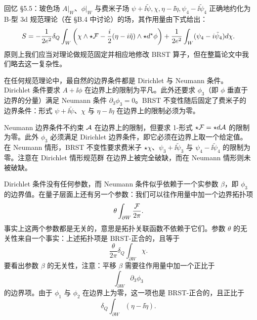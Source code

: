 回忆 §5.5：玻色场 $A|_W$、$\phi|_W$ 与费米子场 $\psi+\ii\tilde\psi,\chi,\eta-\ii\tilde\eta,\psi_4-\ii\tilde\psi_4$ 正确地约化为 B-型 3d 规范理论（在 §B.4 中讨论）的场，其作用量由下式给出：
\[
S=-\frac{1}{2e^2}\delta_Q\int_W\left(\chi\wedge\star\mathcal{F}-\frac{i}{2}(\eta-i\tilde\eta)\wedge\star d^{\star}\phi\right)
+\frac{1}{2e^2}\int_W(\psi_4-i\tilde\psi_4)d\chi .
\]
原则上我们应当对理论做规范固定并相应地修改 BRST 算子，但在整篇论文中我们略去这一复杂性。


在任何规范理论中，最自然的边界条件都是 Dirichlet 与 Neumann 条件。Dirichlet 条件要求 $A+\ii\phi$ 在边界上的限制为平凡。此外还要求 $\phi_3$（即 $\phi$ 垂直于边界的分量）满足 Neumann 条件 $\partial_3\phi_3=0$。BRST 不变性随后固定了费米子的边界条件：形式 $\psi+\ii\tilde\psi$、$\chi$ 与 $\eta-\ii\tilde\eta$ 在边界上的限制必须为零。


Neumann 边界条件不约束 $\mathcal{A}$ 在边界上的限制，但要求 1-形式 $\star\mathcal{F}=\star d\mathcal{A}$ 的限制为零。此外 $\phi_3$ 必须满足 Dirichlet 边界条件，即它必须在边界上取一个给定值。在 Neumann 情形，BRST 不变性要求费米子 $\star\chi$、$\psi_3+\ii\tilde\psi_3$ 与 $\psi_4-\ii\tilde\psi_4$ 的限制为零。注意在 Dirichlet 情形规范群
在边界上被完全破缺，而在 Neumann 情形则未被破缺。

Dirichlet 条件没有任何参数，而 Neumann 条件似乎依赖于一个实参数 $\beta$，即 $\phi_3$ 的边界值。在量子层面上还有另一个参数：我们可以往作用量中加一个边界拓扑项
\[
\theta\int_{\partial W}\frac{\mathcal{F}}{2\pi}.
\]
事实上这两个参数都是无关的，意思是拓扑关联函数不依赖于它们。参数 $\theta$ 的无关性来自一个事实：上述拓扑项是 BRST-正合的，且等于
\[
\frac{\theta}{2\pi}\delta_Q\int_{\partial W}\chi .
\]
要看出参数 $\beta$ 的无关性，注意：平移 $\beta$ 需要往作用量中加一个正比于
\[
\int_{\partial W}\partial_3\phi_3
\]
的边界项。由于 $\phi_1$ 与 $\phi_2$ 在边界上为零，这一项也是 BRST-正合的，且正比于
\[
\delta_Q\int_{\partial W}(\eta-\ii\tilde\eta).
\]


